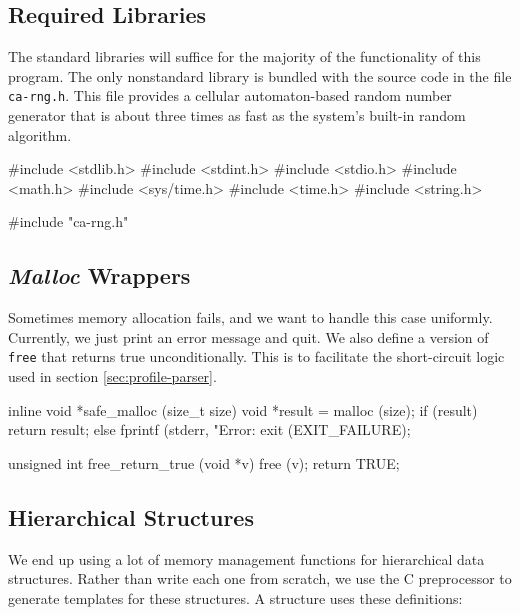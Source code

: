 \documentclass{article}
\begin{document}
    \subsection{Required Libraries}
      \label{sec:libraries}

      The standard libraries will suffice for the majority of the functionality
      of this program. The only nonstandard library is bundled with the source
      code in the file \verb|ca-rng.h|. This file provides a cellular
      automaton-based random number generator that is about three times as fast
      as the system's built-in random algorithm.

\begin{ccode}
#include <stdlib.h>
#include <stdint.h>
#include <stdio.h>
#include <math.h>
#include <sys/time.h>
#include <time.h>
#include <string.h>

#include "ca-rng.h"
\end{ccode}

    \subsection{{\em Malloc} Wrappers}
      \label{sec:malloc}

      Sometimes memory allocation fails, and we want to handle this case
      uniformly. Currently, we just print an error message and quit. We also
      define a version of \verb|free| that returns true unconditionally. This is
      to facilitate the short-circuit logic used in section
      \ref{sec:profile-parser}.

\begin{ccode}
inline void *safe_malloc (size_t size) {
  void *result = malloc (size);
  if (result)
    return result;
  else {
    fprintf (stderr, "Error: %
    exit (EXIT_FAILURE);
  }
}

unsigned int free_return_true (void *v) {
  free (v);
  return TRUE;
}
\end{ccode}

    \subsection{Hierarchical Structures}
      \label{sec:hierarchical}

      We end up using a lot of memory management functions for hierarchical data
      structures. Rather than write each one from scratch, we use the C
      preprocessor to generate templates for these structures. A structure uses
      these definitions:
\end{document}
